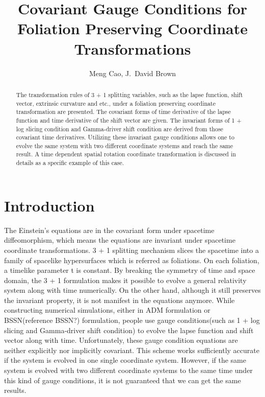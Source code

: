 \documentclass[letterpaper,nofootinbib,prd,amsmath,onecolumn]{revtex4-1}
\begin{document}

\title{Covariant Gauge Conditions for Foliation Preserving Coordinate Transformations}
\author{Meng Cao, J.~David Brown}

\begin{abstract}
The transformation rules of 3 + 1 splitting variables, such as the lapse function, shift vector, extrinsic curvature and etc., under a foliation preserving coordinate transformation are presented. The covariant forms of time derivative of the lapse function and time derivative of the shift vector are given. The invariant forms of 1 + log slicing condition and Gamma-driver shift condition are derived from those covariant time derivatives. Utilizing these invariant gauge conditions allows one to evolve the same system with two different coordinate systems and reach the same result. A time dependent spatial rotation coordinate transformation is discussed in details as a specific example of this case.  
\end{abstract}
\maketitle

\section{Introduction}
The Einstein's equations are in the covariant form under spacetime diffeomorphism, which means the equations are invariant under spacetime coordinate transformations. 3 + 1 splitting mechanism slices the spacetime into a family of spacelike hypersurfaces which is referred as foliations. On each foliation, a timelike parameter t is constant. By breaking the symmetry of time and space domain, the 3 + 1 formulation makes it possible to evolve a general relativity system along with time numerically. On the other hand, although it still preserves the invariant property, it is not manifest in the equations anymore. While constructing numerical simulations, either in ADM formulation \cite{ADM:Witten} or BSSN({\color{red}reference BSSN?}) formulation, people use gauge conditions(such as 1 + log slicing and Gamma-driver shift condition) to evolve the lapse function and shift vector along with time. Unfortunately, these gauge condition equations are neither explicitly nor implicitly covariant. This scheme works sufficiently accurate if the system is evolved in one single coordinate system. However, if the same system is evolved with two different coordinate systems to the same time under this kind of gauge conditions, it is not guaranteed that we can get the same results. 
\end{document}
